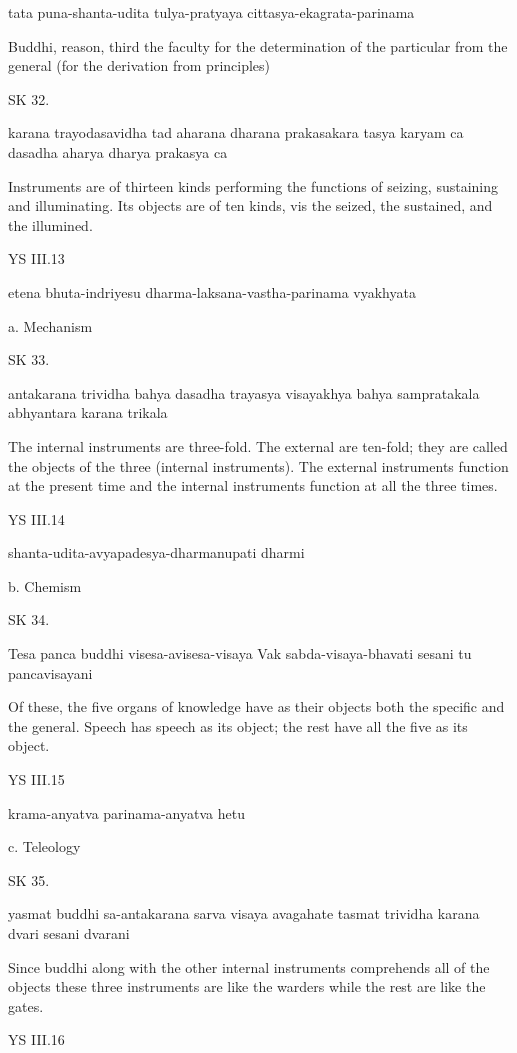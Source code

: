     tata puna-shanta-udita tulya-pratyaya cittasya-ekagrata-parinama

    Buddhi, reason, third the faculty for the determination of
    the particular from the general (for the derivation from principles)


SK 32.

karana trayodasavidha tad aharana dharana prakasakara
tasya karyam ca dasadha aharya dharya prakasya ca

Instruments are of thirteen kinds performing the functions of
seizing, sustaining and illuminating.
Its objects are of ten kinds, vis
the seized, the sustained, and the illumined.

YS III.13

    etena bhuta-indriyesu dharma-laksana-vastha-parinama vyakhyata

    a. Mechanism

SK 33.

antakarana trividha bahya dasadha trayasya visayakhya
bahya sampratakala abhyantara karana trikala

The internal instruments are three-fold.
The external are ten-fold;
they are called the objects of the three (internal instruments).
The external instruments function at the present time and
the internal instruments function at all the three times.

YS III.14

    shanta-udita-avyapadesya-dharmanupati dharmi

    b. Chemism

SK 34.

Tesa panca buddhi visesa-avisesa-visaya
Vak sabda-visaya-bhavati sesani tu pancavisayani

Of these, the five organs of knowledge have as their objects
both the specific and the general.
Speech has speech as its object;
the rest have all the five as its object.

YS III.15

    krama-anyatva parinama-anyatva hetu

    c. Teleology

SK 35.

yasmat buddhi sa-antakarana sarva visaya avagahate
tasmat trividha karana dvari sesani dvarani

Since buddhi along with the other internal instruments
comprehends all of the objects these three instruments are
like the warders while the rest are like the gates.

YS III.16

